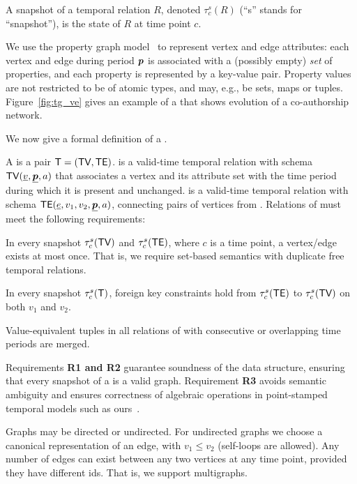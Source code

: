 A snapshot of a temporal relation $R$, denoted $\tau^s_c(R)$ (``s''
stands for ``snapshot''), is the state of $R$ at time point $c$.

We use the property graph model~\cite{GraphDB} to represent vertex and
edge attributes: each vertex and edge during period $\boldsymbol{p}$ is
associated with a (possibly empty) {\em set} of properties, and each
property is represented by a key-value pair.  Property values are not
restricted to be of atomic types, and may, e.g., be sets, maps or
tuples.  Figure~\ref{fig:tg_ve} gives an example of a \tg that shows evolution
of a co-authorship network.

We now give a formal definition of a \tg.

\begin{definition}[TGraph]
A \tg is a pair $\mathsf{T}=(\textsf{TV}, \textsf{TE})$. \tv is a valid-time temporal
relation with schema $\textsf{TV}(\underline{v}, \underline{\boldsymbol{p}}, a)$ that
associates a vertex and its attribute set with the time period during
which it is present and unchanged. \te is a valid-time temporal
relation with schema $\textsf{TE}(\underline{e}, v_1, v_2, \underline{\boldsymbol{p}},
a)$, connecting pairs of vertices from \tv.
%
Relations of \tve must meet the following requirements:

\begin{description}[noitemsep]
\item [R1: Unique vertices/ edges] In every snapshot $\tau^s_c (\textsf{TV})$
  and $\tau^s_c (\textsf{TE})$, where $c$ is a time point, a vertex/edge
  exists at most once.  That is, we require set-based semantics with
  duplicate free temporal relations.
\item [R2: Referential integrity] In every snapshot $\tau^s_c (\mathsf{T})$,
  foreign key constraints hold from $\tau^s_c (\textsf{TE})$ to $\tau^s_c
  (\textsf{TV})$ on both $v_1$ and $v_2$.
\item [R3: Coalesced] Value-equivalent tuples in all relations of \tve
  with consecutive or overlapping time periods are merged.  
\end{description}
\label{def:tg}
\vspace{-0.5cm}
\end{definition}

Requirements {\bf R1 and R2} guarantee soundness of the \tg data
structure, ensuring that every snapshot of a \tg is a valid graph.
Requirement {\bf R3} avoids semantic ambiguity and ensures correctness
of algebraic operations in point-stamped temporal models such as
ours~\cite{DBLP:reference/db/JensenS09k}.

Graphs may be directed or undirected.  For undirected graphs we choose
a canonical representation of an edge, with $v_1 \leq v_2$ (self-loops
are allowed).  Any number of edges can exist between any two vertices
at any time point, provided they have different ids.  That is, we
support multigraphs.


